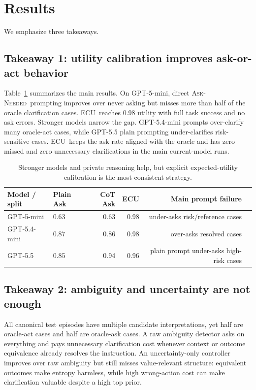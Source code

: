 \documentclass{article} %
\newcommand{\ecu}{\textsc{ECU}}
\newcommand{\askneeded}{\textsc{Ask-Needed}}
\begin{document}
\section{Results}

We emphasize three takeaways.

\subsection{Takeaway 1: utility calibration improves ask-or-act behavior}

Table~\ref{tab:headline-api} summarizes the main results. On GPT-5-mini, direct \askneeded\ prompting improves over never asking but misses more than half of the oracle clarification cases. \ecu\ reaches 0.98 utility with full task success and no ask errors. Stronger models narrow the gap. GPT-5.4-mini prompts over-clarify many oracle-act cases, while GPT-5.5 plain prompting under-clarifies risk-sensitive cases. \ecu\ keeps the ask rate aligned with the oracle and has zero missed and zero unnecessary clarifications in the main current-model runs.

\begin{table}[t]
\centering
\small
\begin{tabular}{llrrrr}
\toprule
Model / split & Plain Ask & CoT Ask & \ecu & Main prompt failure \\
\midrule
GPT-5-mini & 0.63 & 0.63 & 0.98 & under-asks risk/reference cases \\
GPT-5.4-mini  & 0.87 & 0.86 & 0.98 & over-asks resolved cases \\
GPT-5.5 & 0.85 & 0.94 & 0.96 & plain prompt under-asks high-risk cases \\
\bottomrule
\end{tabular}
\caption{Stronger models and private reasoning help, but explicit expected-utility calibration is the most consistent strategy.}
\label{tab:headline-api}
\end{table}

\subsection{Takeaway 2: ambiguity and uncertainty are not enough}

All canonical test episodes have multiple candidate interpretations, yet half are oracle-act cases and half are oracle-ask cases. A raw ambiguity detector asks on everything and pays unnecessary clarification cost whenever context or outcome equivalence already resolves the instruction. An uncertainty-only controller improves over raw ambiguity but still misses value-relevant structure: equivalent outcomes make entropy harmless, while high wrong-action cost can make clarification valuable despite a high top prior.
\end{document}
